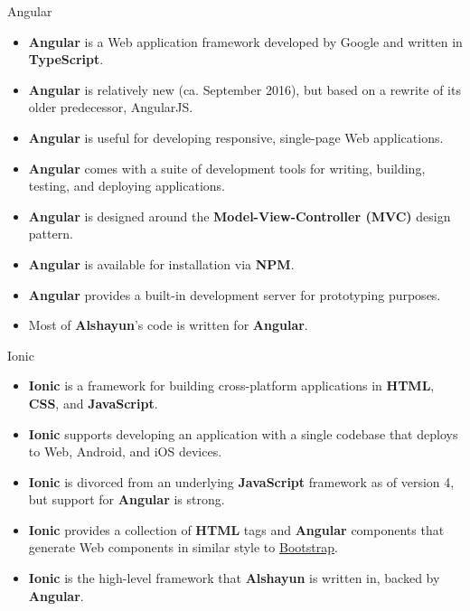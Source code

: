 \documentclass{beamer}
\begin{document}
\begin{frame}{Angular}
    \begin{itemize}
        \item \textbf{Angular} is a Web application framework developed by
            Google and written in \textbf{TypeScript}.
        \item \textbf{Angular} is relatively new (ca. September 2016), but based
            on a rewrite of its older predecessor, AngularJS.
        \item \textbf{Angular} is useful for developing responsive, single-page
            Web applications.
        \item \textbf{Angular} comes with a suite of development tools for
            writing, building, testing, and deploying applications.
        \item \textbf{Angular} is designed around the
            \textbf{Model-View-Controller (MVC)} design pattern.
        \item \textbf{Angular} is available for installation via \textbf{NPM}.
        \item \textbf{Angular} provides a built-in development server for
            prototyping purposes.
        \item Most of \textbf{Alshayun}'s code is written for \textbf{Angular}.
    \end{itemize}
\end{frame}

\begin{frame}{Ionic}
    \begin{itemize}
        \item \textbf{Ionic} is a framework for building cross-platform
            applications in \textbf{HTML}, \textbf{CSS}, and
            \textbf{JavaScript}.
        \item \textbf{Ionic} supports developing an application with a single
            codebase that deploys to Web, Android, and iOS devices.
        \item \textbf{Ionic} is divorced from an underlying \textbf{JavaScript}
            framework as of version 4, but support for \textbf{Angular} is
            strong.
        \item \textbf{Ionic} provides a collection of \textbf{HTML} tags and
            \textbf{Angular} components that generate Web components in similar
            style to \href{https://getbootstrap.com/}{Bootstrap}.
        \item \textbf{Ionic} is the high-level framework that \textbf{Alshayun}
            is written in, backed by \textbf{Angular}.
    \end{itemize}
\end{frame}
\end{document}
